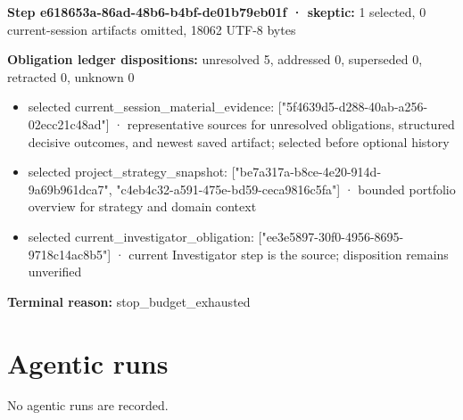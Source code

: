 \documentclass[11pt]{article}
\begin{document}
\textbf{Step e618653a-86ad-48b6-b4bf-de01b79eb01f · skeptic:} 1 selected, 0 current-session artifacts omitted, 18062 UTF-8 bytes\par
\textbf{Obligation ledger dispositions:} unresolved 5, addressed 0, superseded 0, retracted 0, unknown 0\par
\begin{itemize}
\item selected current\_session\_material\_evidence: ["5f4639d5-d288-40ab-a256-02ecc21c48ad"] · representative sources for unresolved obligations, structured decisive outcomes, and newest saved artifact; selected before optional history
\item selected project\_strategy\_snapshot: ["be7a317a-b8ce-4e20-914d-9a69b961dca7", "c4eb4c32-a591-475e-bd59-ceca9816c5fa"] · bounded portfolio overview for strategy and domain context
\item selected current\_investigator\_obligation: ["ee3e5897-30f0-4956-8695-9718c14ac8b5"] · current Investigator step is the source; disposition remains unverified
\end{itemize}
\textbf{Terminal reason:} stop\_budget\_exhausted\par
\section{Agentic runs}
No agentic runs are recorded.\par
\end{document}

